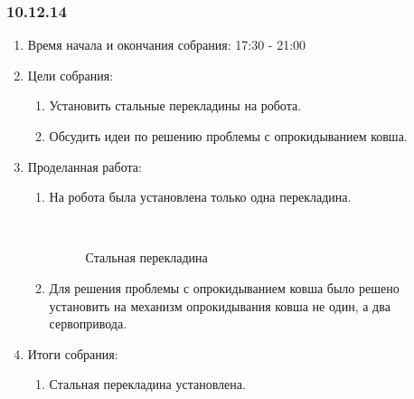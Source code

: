 \subsubsection{10.12.14}

\begin{enumerate}
	\item Время начала и окончания собрания:
	17:30 - 21:00
	\item Цели собрания:
	\begin{enumerate}
	  \item Установить стальные перекладины на робота.
	  
	  \item Обсудить идеи по решению проблемы с опрокидыванием ковша.
	  
    \end{enumerate}
	\item Проделанная работа:
	\begin{enumerate}
	  \item На робота была установлена только одна перекладина.
	  
	  \begin{figure}[H]
	  	\begin{minipage}[h]{0.2\linewidth}
	  		\center  
	  	\end{minipage}
	  	\begin{minipage}[h]{0.6\linewidth}
	  		\caption{Стальная перекладина}
	  	\end{minipage}
	  \end{figure}
	  
	  \item Для решения проблемы с опрокидыванием ковша было решено установить на механизм опрокидывания ковша не один, а два сервопривода.
	  
    \end{enumerate}
    
	\item Итоги собрания: 
	\begin{enumerate}
	  \item Стальная перекладина установлена.
	  

\end{enumerate}
\end{enumerate}
